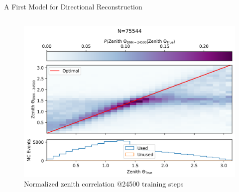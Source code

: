 \begin{frame}{A First Model for Directional Reconstruction}
\begin{columns}
\begin{column}{.65\textwidth}
\begin{figure}
{                    \includegraphics[width=.95\textwidth]{media/zenith_24500.png}
                    \caption*{\small Normalized zenith correlation @24500 training steps}
                }
\end{figure}
\end{column}
\end{columns}
\end{frame}
